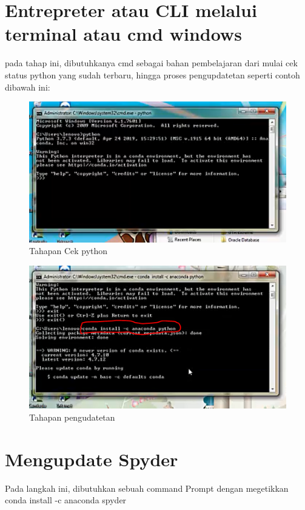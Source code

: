 \section{Entrepreter atau CLI melalui terminal atau cmd windows}
pada tahap ini, dibutuhkanya cmd sebagai bahan pembelajaran dari mulai cek status python yang sudah terbaru, hingga proses pengupdatetan seperti contoh dibawah ini:

	\begin{figure}
	\includegraphics[scale=0.5]{section/13.png}
	\centering
	\caption{Tahapan Cek python}
	\end{figure}

	\begin{figure}
	\includegraphics[scale=0.5]{section/14.png}
	\centering
	\caption{Tahapan pengudatetan}
	\end{figure}

\section{Mengupdate Spyder}
Pada langkah ini, dibutuhkan sebuah command Prompt dengan megetikkan
\\ conda install -c anaconda spyder

